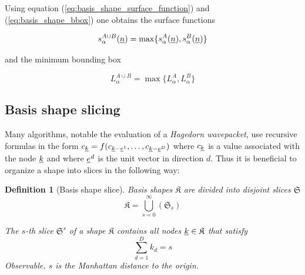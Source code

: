 \documentclass{article}
\newtheorem*{definition}{Definition}
\begin{document}
Using equation (\ref{eq:basis_shape_surface_function}) and (\ref{eq:basis_shape_bbox})
one obtains the surface functions

\begin{equation}
  s_{\alpha}^{A \cup B}(\underline{n}) = \max\{s_{\alpha}^A(\underline{n}), s_{\alpha}^B(\underline{n})\}
\end{equation}

and the minimum bounding box

\begin{equation}
  L_{\alpha}^{A \cup B} = \max\{L_{\alpha}^{A}, L_{\alpha}^{B}\}
\end{equation}

\subsection{Basis shape slicing} \label{sec:basis_shape_slice}
Many algorithms, notable the evaluation of a \emph{Hagedorn wavepacket},
use recursive formulas in the form
\( c_{\underline{k}} = f(c_{\underline{k}-\underline{e}^1}, \ldots,
c_{\underline{k}-\underline{e}^D}) \)
where \( c_{\underline{k}} \)
is a value associated with the node \( \underline{k} \)
and where \( \underline{e}^d \)
is the unit vector in direction \( d \).
Thus it is beneficial to organize a shape into slices in the following way:

\begin{definition}[Basis shape slice]
  \label{eq:basis_shape_slice}
  Basis shapes \(\mathfrak{K}\) are divided into disjoint slices \(\mathfrak{S}\)
  \begin{equation}
    \mathfrak{K}=\bigcup_{s=0}^{\infty} \left(\mathfrak{S}_s\right)
  \end{equation}
  
  The \( s \)-th
  slice \( \mathfrak{S}^s \) of a shape \( \mathfrak{K} \)
  contains all nodes \( \underline{k} \in \mathfrak{K} \)
  that satisfy
  \begin{equation}
    \sum_{d=1}^{D} k_d = s
  \end{equation}
  Observable, \(s\) is the Manhattan distance to the origin.
\end{definition}
\end{document}
